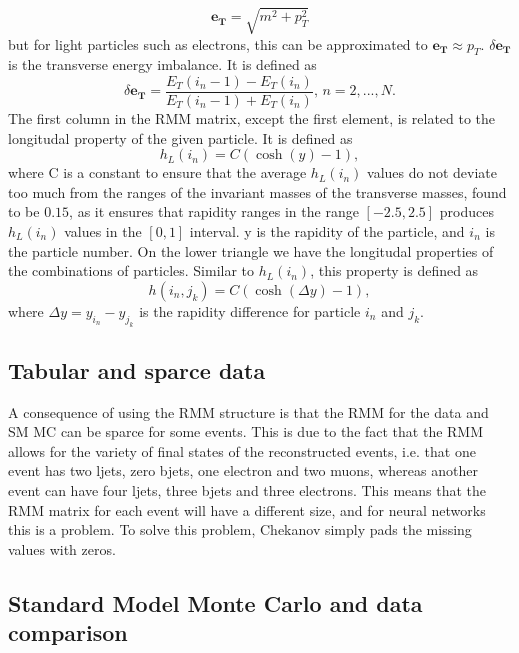 \begin{equation}\label{eq:et}
    \boldsymbol{e_T} = \sqrt{m^2 + p_T^2}
\end{equation}
but for light particles such as electrons, this can be approximated to $\boldsymbol{e_T} \approx p_T$. $\delta\boldsymbol{e_T}$ 
is the transverse energy imbalance. It is defined as 
\begin{equation}\label{eq:deltaet}
    \delta\boldsymbol{e_T} = \frac{E_T(i_n-1) - E_T(i_n)}{E_T(i_n-1) + E_T(i_n)}, \, n = 2, ..., N.
\end{equation}
The first column in the RMM matrix, except the first element, is related to the longitudal property of the given particle. 
It is defined as
\begin{equation*}
    h_L(i_n) = C(\cosh{(y)} - 1),
\end{equation*}
 where C is a constant to ensure that the average $h_L(i_n)$ values do not deviate too much from the ranges of the invariant masses 
of the transverse masses, found to be $0.15$, as it ensures that rapidity ranges in the range $[-2.5, 2.5]$ produces $h_L(i_n)$ values in the 
$[0,1]$ interval\cite{Chekanov_2019}. y is the rapidity of the particle, and $i_n$ is the particle number. 
On the lower triangle we have the longitudal properties of the combinations of particles. Similar to $h_L(i_n)$, this property is defined as 
\begin{equation*}
    h(i_n, j_k) = C(\cosh{(\Delta y)} - 1),
\end{equation*}
where $\Delta y = y_{i_n} - y_{j_k}$ is the rapidity difference for particle $i_n$ and $j_k$. 


\subsection*{Tabular and sparce data}
A consequence of using the RMM structure is that the RMM for the data and SM MC can be sparce for some events. This is due to the fact that the RMM allows for 
the variety of final states of the reconstructed events, i.e. that one event has two ljets, zero bjets, one electron and two muons, whereas another 
event can have four ljets, three bjets and three electrons. This means that the RMM matrix for each event will have a different size, 
and for neural networks this is a problem. To solve this problem, Chekanov simply pads the missing values with zeros\cite{Chekanov_2019}. 

\subsection*{Standard Model Monte Carlo and data comparison}\label{sec:mcdatacomp}

